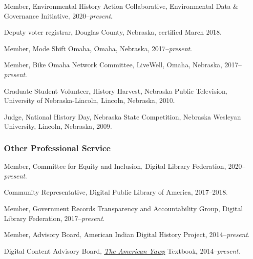 Member, Environmental History Action Collaborative, Environmental Data
\& Governance Initiative, 2020--\emph{present}.

Deputy voter registrar, Douglas County, Nebraska, certified March 2018.

Member, Mode Shift Omaha, Omaha, Nebraska, 2017--\emph{present}.

Member, Bike Omaha Network Committee, LiveWell, Omaha, Nebraska,
2017--\emph{present}.

Graduate Student Volunteer, History Harvest, Nebraska Public Television,
University of Nebraska-Lincoln, Lincoln, Nebraska, 2010.

Judge, National History Day, Nebraska State Competition, Nebraska
Wesleyan University, Lincoln, Nebraska, 2009.

\subsubsection{Other Professional
Service}\label{other-professional-service}

Member, Committee for Equity and Inclusion, Digital Library Federation,
2020--\emph{present}.

Community Representative, Digital Public Library of America, 2017--2018.

Member, Government Records Transparency and Accountability Group,
Digital Library Federation, 2017--\emph{present}.

Member, Advisory Board, American Indian Digital History Project,
2014--\emph{present}.

Digital Content Advisory Board, \emph{\href{http://americanyawp.com}{The
American Yawp}} Textbook, 2014--\emph{present}.
